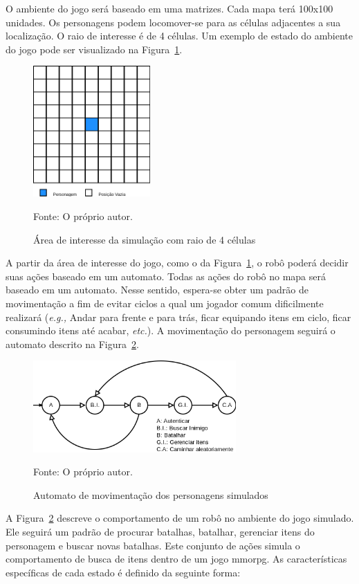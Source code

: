 O ambiente do jogo será baseado em uma matrizes. Cada mapa terá 100x100 unidades.
%
Os personagens podem locomover-se para as células adjacentes a sua localização.
%
O raio de interesse é de 4 células.
%
Um exemplo de estado do ambiente do jogo pode ser visualizado na Figura~\ref{fig:roi}.

\begin{figure}[htb!]
  \caption{Área de interesse da simulação com raio de 4 células}
  \label{fig:roi}
  \includegraphics[height=5.0cm]{img/cap3/roi.png}
  \centering

  Fonte: O próprio autor.
\end{figure}

A partir da área de interesse do jogo, como o da Figura~\ref{fig:roi}, o robô poderá decidir suas ações baseado em um automato.
%
Todas as ações do robô no mapa será baseado em um automato.
%
Nesse sentido, espera-se obter um padrão de movimentação a fim de evitar ciclos a qual um jogador comum dificilmente realizará (\textit{e.g.,} Andar para frente e para trás, ficar equipando itens em ciclo, ficar consumindo itens até acabar, \textit{etc.}).
%
A movimentação do personagem seguirá o automato descrito na Figura~\ref{fig:movimentacao}.


\begin{figure}[htb!]
  \caption{Automato de movimentação dos personagens simulados}
  \label{fig:movimentacao}
  \includegraphics[height=3.5cm]{img/cap3/movimentacao.png}
  \centering

  Fonte: O próprio autor.
\end{figure}

A Figura~\ref{fig:movimentacao} descreve o comportamento de um robô no ambiente do jogo simulado.
%
Ele seguirá um padrão de procurar batalhas, batalhar, gerenciar itens do personagem e buscar novas batalhas.
%
Este conjunto de ações simula o comportamento de busca de itens dentro de um jogo \ac{mmorpg}.
%
As características específicas de cada estado é definido da seguinte forma:


